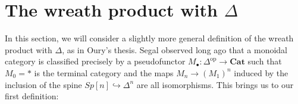\documentclass{amsart}
\numberwithin{equation}{section}
\theoremstyle{plain}   %
\theoremstyle{remark}
\theoremstyle{plain}
\newcommand{\op}{\ensuremath{\mathrm{op}}}
\newcommand{\Cat}{\ensuremath{\mathbf{Cat}}}
\begin{document}

\section{The wreath product with \(\Delta\)}
In this section, we will consider a slightly more general definition of the wreath product with \(\Delta\), as in Oury's thesis. Segal observed long ago that a monoidal category is classified precisely by a pseudofunctor \(M_\bullet:\Delta^\op\to \Cat\) such that \(M_0=\ast\) is the terminal category and the maps \(M_n \to {(M_1)}^n\) induced by the inclusion of the spine \(Sp[n]\hookrightarrow \Delta^n\) are all isomorphisms.  This brings us to our first definition:
\end{document}
